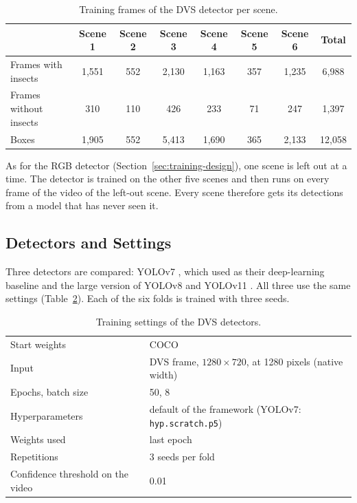 \begin{table}[ht]
    \centering
    \caption{Training frames of the DVS detector per scene.}
    \label{tab:dvs-training-data}
    \small
    \begin{tabular}{lccccccc}
        \hline
         & Scene 1 & Scene 2 & Scene 3 & Scene 4 & Scene 5 & Scene 6 & Total \\
        \hline
        Frames with insects & 1,551 & 552 & 2,130 & 1,163 & 357 & 1,235 & 6,988 \\
        Frames without insects & 310 & 110 & 426 & 233 & 71 & 247 & 1,397 \\
        Boxes & 1,905 & 552 & 5,413 & 1,690 & 365 & 2,133 & 12,058 \\
        \hline
    \end{tabular}
\end{table}

As for the RGB detector (Section~\ref{sec:training-design}), one scene is left out at a time. The detector is
trained on the other five scenes and then runs on every frame of the video of the left-out scene. Every scene 
therefore gets its detections from a model that has never seen it.

\subsection{Detectors and Settings}

Three detectors are compared: YOLOv7 , which \textcite{gebauer_towards_2024} used as
their deep-learning baseline and the large version of YOLOv8  and YOLOv11 
\parencite{jocher_yolo11_2024}. All three use the same settings (Table~\ref{tab:dvs-settings}). Each of the six 
folds is trained with three seeds.

\begin{table}[ht]
    \centering
    \caption{Training settings of the DVS detectors.}
    \label{tab:dvs-settings}
    \small
    \begin{tabular}{ll}
        \hline
        Start weights & COCO \\
        Input & DVS frame, $1280 \times 720$, at 1280 pixels (native width) \\
        Epochs, batch size & 50, 8 \\
        Hyperparameters & default of the framework (YOLOv7: \texttt{hyp.scratch.p5}) \\
        Weights used & last epoch \\
        Repetitions & 3 seeds per fold \\
        Confidence threshold on the video & 0.01 \\
        \hline
    \end{tabular}
\end{table}

